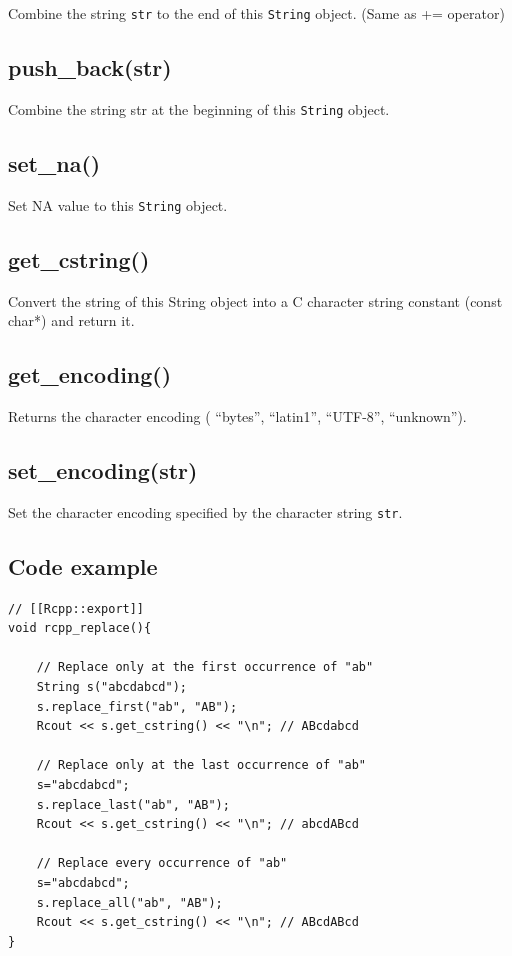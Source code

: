 \documentclass[]{book}
\theoremstyle{definition}
\theoremstyle{definition}
\theoremstyle{remark}
\begin{document}
Combine the string \texttt{str} to the end of this \texttt{String}
object. (Same as += operator)

\subsection{push\_back(str)}\label{push_backstr-1}

Combine the string str at the beginning of this \texttt{String} object.

\subsection{set\_na()}\label{set_na}

Set NA value to this \texttt{String} object.

\subsection{get\_cstring()}\label{get_cstring}

Convert the string of this String object into a C character string
constant (const char*) and return it.

\subsection{get\_encoding()}\label{get_encoding}

Returns the character encoding ( ``bytes'', ``latin1'', ``UTF-8'',
``unknown'').

\subsection{set\_encoding(str)}\label{set_encodingstr}

Set the character encoding specified by the character string
\texttt{str}.

\subsection{Code example}\label{code-example}

\begin{verbatim}
// [[Rcpp::export]]
void rcpp_replace(){

    // Replace only at the first occurrence of "ab"
    String s("abcdabcd");
    s.replace_first("ab", "AB");
    Rcout << s.get_cstring() << "\n"; // ABcdabcd

    // Replace only at the last occurrence of "ab"
    s="abcdabcd";
    s.replace_last("ab", "AB");
    Rcout << s.get_cstring() << "\n"; // abcdABcd

    // Replace every occurrence of "ab"
    s="abcdabcd";
    s.replace_all("ab", "AB");
    Rcout << s.get_cstring() << "\n"; // ABcdABcd
}
\end{verbatim}
\end{document}
